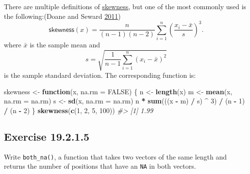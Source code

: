 \documentclass[]{book}
\newenvironment{Shaded}{\begin{snugshade}}{\end{snugshade}}
\newcommand{\CommentTok}[1]{\textcolor[rgb]{0.56,0.35,0.01}{\textit{#1}}}
\newcommand{\ControlFlowTok}[1]{\textcolor[rgb]{0.13,0.29,0.53}{\textbf{#1}}}
\newcommand{\DataTypeTok}[1]{\textcolor[rgb]{0.13,0.29,0.53}{#1}}
\newcommand{\DecValTok}[1]{\textcolor[rgb]{0.00,0.00,0.81}{#1}}
\newcommand{\KeywordTok}[1]{\textcolor[rgb]{0.13,0.29,0.53}{\textbf{#1}}}
\newcommand{\NormalTok}[1]{#1}
\newcommand{\OperatorTok}[1]{\textcolor[rgb]{0.81,0.36,0.00}{\textbf{#1}}}
\newcommand{\OtherTok}[1]{\textcolor[rgb]{0.56,0.35,0.01}{#1}}
\newcommand{\StringTok}[1]{\textcolor[rgb]{0.31,0.60,0.02}{#1}}
\theoremstyle{plain}
\theoremstyle{remark}
\begin{document}
There are multiple definitions of
\href{https://en.wikipedia.org/wiki/Skewness}{skewness}, but one of the
most commonly used is the following:(Doane and Seward
\protect\hyperlink{ref-DoaneSeward2011}{2011}) \[
\mathsf{skewness}(x) = \frac{n}{(n - 1)(n - 2)} \sum_{i = 1}^{n} {\left( \frac{x_i - \bar{x}}{s} \right)}^{3} .
\] where \(\bar{x}\) is the sample mean and \[
s = \sqrt{\frac{1}{n - 1} \sum_{i = 1}^{n} (x_i - \bar{x})^2}
\] is the sample standard deviation. The corresponding function is:

\begin{Shaded}
\begin{Highlighting}[]
\NormalTok{skewness <-}\StringTok{ }\ControlFlowTok{function}\NormalTok{(x, }\DataTypeTok{na.rm =} \OtherTok{FALSE}\NormalTok{) \{}
\NormalTok{  n <-}\StringTok{ }\KeywordTok{length}\NormalTok{(x)}
\NormalTok{  m <-}\StringTok{ }\KeywordTok{mean}\NormalTok{(x, }\DataTypeTok{na.rm =}\NormalTok{ na.rm)}
\NormalTok{  s <-}\StringTok{ }\KeywordTok{sd}\NormalTok{(x, }\DataTypeTok{na.rm =}\NormalTok{ na.rm)}
\NormalTok{  n }\OperatorTok{*}\StringTok{ }\KeywordTok{sum}\NormalTok{(((x }\OperatorTok{-}\StringTok{ }\NormalTok{m) }\OperatorTok{/}\StringTok{ }\NormalTok{s) }\OperatorTok{^}\StringTok{ }\DecValTok{3}\NormalTok{) }\OperatorTok{/}\StringTok{ }\NormalTok{(n }\OperatorTok{-}\StringTok{ }\DecValTok{1}\NormalTok{) }\OperatorTok{/}\StringTok{ }\NormalTok{(n }\OperatorTok{-}\StringTok{ }\DecValTok{2}\NormalTok{)}
\NormalTok{\}}
\KeywordTok{skewness}\NormalTok{(}\KeywordTok{c}\NormalTok{(}\DecValTok{1}\NormalTok{, }\DecValTok{2}\NormalTok{, }\DecValTok{5}\NormalTok{, }\DecValTok{100}\NormalTok{))}
\CommentTok{#> [1] 1.99}
\end{Highlighting}
\end{Shaded}

\hypertarget{exercise-19.2.1.5}{%
\subsection*{\texorpdfstring{Exercise
{19.2.1.5}}{Exercise 19.2.1.5}}\label{exercise-19.2.1.5}}

Write \texttt{both\_na()}, a function that takes two vectors of the same
length and returns the number of positions that have an \texttt{NA} in
both vectors.
\end{document}
